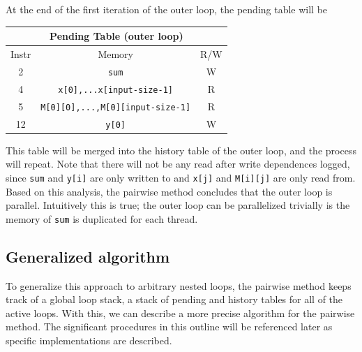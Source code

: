 \documentclass[12pt,twoside]{reedthesis}
\begin{document}
		At the end of the first iteration of the outer loop, the pending table will be
			
		\begin{tabular}{ |c|c|c| } 
			\hline
			\multicolumn{3}{|c|}{Pending Table (outer loop)} \\
			\hline
			Instr & Memory & R/W \\ 
			\hline
			2 & \texttt{sum} & W \\ 
			4 & \texttt{x[0],...x[input-size-1]} & R \\ 
			5 & \texttt{M[0][0],...,M[0][input-size-1]} & R \\ 
			12 & \texttt{y[0]} & W \\
			\hline
		\end{tabular}
	
		This table will be merged into the history table of the outer loop, and the process will repeat. Note that there will not be any read after write dependences logged, since \texttt{sum} and \texttt{y[i]} are only written to and \texttt{x[j]} and \texttt{M[i][j]} are only read from. Based on this analysis, the pairwise method concludes that the outer loop is parallel. 
		Intuitively this is true; the outer loop can be parallelized trivially is the memory of \texttt{sum} is duplicated for each thread. 
	
		\subsection{Generalized algorithm}
		
		To generalize this approach to arbitrary nested loops, the pairwise method keeps track of a global loop stack, a stack of pending and history tables for all of the active loops. With this, we can describe a more precise algorithm for the pairwise method. The significant procedures in this outline will be referenced later as specific implementations are described.
		
\end{document}
